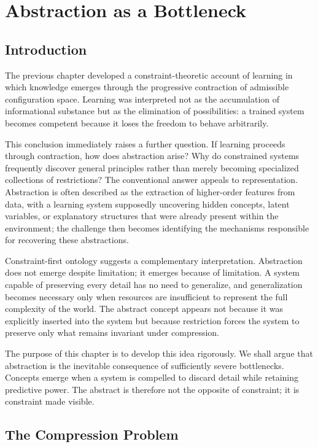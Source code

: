 \documentclass[11pt,oneside]{book}
\theoremstyle{plain}
\theoremstyle{definition}
\theoremstyle{remark}
\begin{document}
\chapter{Abstraction as a Bottleneck}

\section{Introduction}

The previous chapter developed a constraint-theoretic account of learning in which knowledge emerges through the progressive contraction of admissible configuration space. Learning was interpreted not as the accumulation of informational substance but as the elimination of possibilities: a trained system becomes competent because it loses the freedom to behave arbitrarily.

This conclusion immediately raises a further question. If learning proceeds through contraction, how does abstraction arise? Why do constrained systems frequently discover general principles rather than merely becoming specialized collections of restrictions? The conventional answer appeals to representation. Abstraction is often described as the extraction of higher-order features from data, with a learning system supposedly uncovering hidden concepts, latent variables, or explanatory structures that were already present within the environment; the challenge then becomes identifying the mechanisms responsible for recovering these abstractions.

Constraint-first ontology suggests a complementary interpretation. Abstraction does not emerge despite limitation; it emerges because of limitation. A system capable of preserving every detail has no need to generalize, and generalization becomes necessary only when resources are insufficient to represent the full complexity of the world. The abstract concept appears not because it was explicitly inserted into the system but because restriction forces the system to preserve only what remains invariant under compression.

The purpose of this chapter is to develop this idea rigorously. We shall argue that abstraction is the inevitable consequence of sufficiently severe bottlenecks. Concepts emerge when a system is compelled to discard detail while retaining predictive power. The abstract is therefore not the opposite of constraint; it is constraint made visible.

\section{The Compression Problem}
\end{document}
